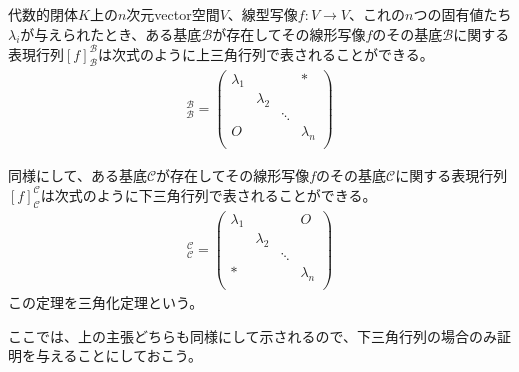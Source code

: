\documentclass[dvipdfmx]{jsarticle}
\begin{document}
\begin{thm}[三角化定理]\label{2.2.3.3}
代数的閉体$K$上の$n$次元vector空間$V$、線型写像$f:V \rightarrow V$、これの$n$つの固有値たち$\lambda_{i}$が与えられたとき、ある基底$\mathcal{B}$が存在してその線形写像$f$のその基底$\mathcal{B}$に関する表現行列$[ f]_{\mathcal{B}}^{\mathcal{B}}$は次式のように上三角行列で表されることができる。
\begin{align*}
[ f]_{\mathcal{B}}^{\mathcal{B}} = \begin{pmatrix}
\lambda_{1} & \  & \  & * \\
\  & \lambda_{2} & \  & \  \\
\  & \  & \ddots & \  \\
O & \  & \  & \lambda_{n} \\
\end{pmatrix}
\end{align*}\par
同様にして、ある基底$\mathcal{C}$が存在してその線形写像$f$のその基底$\mathcal{C}$に関する表現行列$[ f]_{\mathcal{C}}^{\mathcal{C}}$は次式のように下三角行列で表されることができる。
\begin{align*}
[ f]_{\mathcal{C}}^{\mathcal{C}} = \begin{pmatrix}
\lambda_{1} & \  & \  & O \\
\  & \lambda_{2} & \  & \  \\
\  & \  & \ddots & \  \\
* & \  & \  & \lambda_{n} \\
\end{pmatrix}
\end{align*}
この定理を三角化定理という。
\end{thm}\par
ここでは、上の主張どちらも同様にして示されるので、下三角行列の場合のみ証明を与えることにしておこう。
\end{document}
